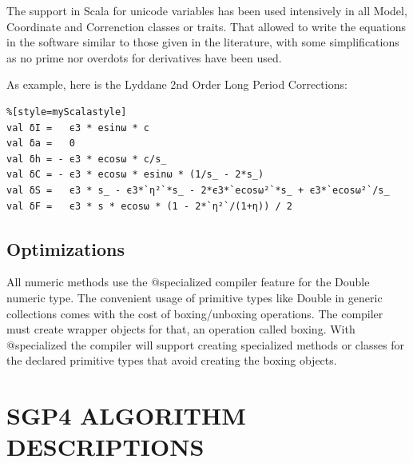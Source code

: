 \documentclass{article}
\begin{document}
The support in Scala for unicode variables has been used intensively in all Model,
Coordinate and Correnction classes or traits. That allowed to write
the equations in the software similar to those given in the literature, with some
simplifications as no prime nor overdots for derivatives have been used.



As example, here is the Lyddane 2nd Order Long Period Corrections:
\begin{lstlisting}%[style=myScalastyle]
val δI =   ϵ3 * esinω * c
val δa =   0
val δh = - ϵ3 * ecosω * c/s_
val δC = - ϵ3 * ecosω * esinω * (1/s_ - 2*s_)
val δS =   ϵ3 * s_ - ϵ3*`η²`*s_ - 2*ϵ3*`ecosω²`*s_ + ϵ3*`ecosω²`/s_
val δF =   ϵ3 * s * ecosω * (1 - 2*`η²`/(1+η)) / 2
\end{lstlisting}

\subsection{Optimizations}
\label{sec:optimizations}

All numeric methods use the @specialized compiler feature for the Double numeric type.
The convenient usage of primitive types like Double in generic collections comes with
the cost of boxing/unboxing operations. The compiler
must create wrapper objects for that, an operation called boxing. With @specialized
the compiler will support creating specialized methods or classes for the
declared primitive types that avoid creating the boxing objects.




\section{SGP4 ALGORITHM DESCRIPTIONS}
\label{sec:algorithms}
\end{document}
